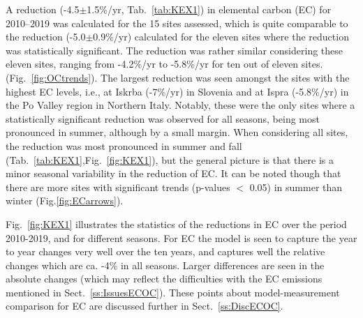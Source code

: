 %
A  reduction (-4.5$\pm$1.5\%/yr, Tab.~\ref{tab:KEX1}) 
in elemental carbon (EC) for 2010--2019 was
calculated for the 15 sites assessed, which is
quite comparable to the reduction (-5.0$\pm$0.9\%/yr)
calculated for the eleven sites where the reduction was statistically
significant. The reduction was rather similar considering these eleven
sites, ranging from -4.2\%/yr to -5.8\%/yr for ten out of eleven
sites. %
(Fig.~\ref{fig:OCtrends}). 
The largest reduction was seen amongst the sites with the
highest EC levels, i.e., at Iskrba (-7\%/yr) in Slovenia and at Ispra
(-5.8\%/yr) in the Po Valley region in Northern Italy. Notably, these
were the only sites where a statistically significant reduction was
observed for all seasons, being most pronounced in summer, although
by a small margin. When considering all sites, the reduction was most
pronounced in summer and fall (Tab.~\ref{tab:KEX1},Fig.~\ref{fig:KEX1}), but the general picture is
that there is a minor seasonal variability in the reduction of EC. It can be noted though that
there are more sites with significant trends (p-values $<$ 0.05)  in summer than winter (Fig.\ref{fig:ECarrows}).

Fig.~\ref{fig:KEX1} illustrates the statistics of the reductions in EC  over the period 2010-2019, and for different seasons. For EC the model is seen to capture the year to year changes very well over the ten years, and captures well the relative changes which are ca. -4\% in all seasons. Larger differences are seen in the absolute changes (which may reflect the difficulties with the EC emissions mentioned in Sect.~\ref{ss:IssuesECOC}).
These points about model-measurement comparison for EC are discussed further in Sect.~\ref{ss:DiscECOC}.

